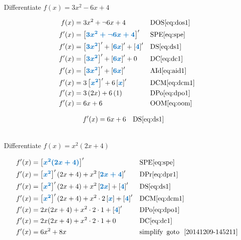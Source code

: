 \documentclass[20150903-160354-rs2.2-MarksMathNotebook.tex]{subfiles}
\begin{document}
\begin{example}[id:20141128-151834] \label{20141128-151834} \hfill \\

Differentiate $f(x)=3x^2-6x+4$

\soln

\solnsteps
\begin{align*}
f(x) &= 3x^2 + \neg 6x + 4 && \text{DOS} \eqref{eq:dos1} \\
f'(x) &= \farg{3x^2 + \neg 6x + 4}' && \text{SPE} \eqref{eq:spe} \\
f'(x) &= \farg{3x^2}' + \farg{6x}' + \farg{4}' && \text{DS} \eqref{eq:ds1} \\
f'(x) &= \farg{3x^2}' + \farg{6x}' + 0 && \text{DC} \eqref{eq:dc1} \\
f'(x) &= \farg{3x^2}' + \farg{6x}' && \text{AId} \eqref{eq:aid1} \\
f'(x) &= 3\farg{x^2}' + 6\farg{x}' && \text{DCM} \eqref{eq:dcm1} \\
f'(x) &= 3 \left(2x \right) + 6 \left(1\right) && \text{DPo} \eqref{eq:dpo1} \\
f'(x) &= 6x+6 && \text{OOM} \eqref{eq:oom}
\end{align*}

\soln
\lesssteps
\begin{align*}
f'(x) & = 6x+6 && \text{DS} \eqref{eq:ds1}
\end{align*}
\end{example}

\begin{example}[id:20141209-144203] \label{20141209-144203} \hfill \\

Differentiate $f(x)=x^2(2x+4)$

\soln

\solnsteps
\begin{align*}
f'(x)&= \farg{x^2(2x+4)}' && \text{SPE} \eqref{eq:spe} \\
f'(x)&= \farg{x^2}'(2x+4)+x^2\farg{2x+4}' && \text{DPr} \eqref{eq:dpr1} \\
f'(x)&= \farg{x^2}'(2x+4)+x^2\farg{2x}+\farg{4}' && \text{DS} \eqref{eq:ds1} \\
f'(x)&= \farg{x^2}'(2x+4)+x^2 \cdot 2 \farg{x}+\farg{4}' && \text{DCM} \eqref{eq:dcm1} \\
f'(x)&= 2x(2x+4)+ x^2\cdot 2 \cdot 1 + \farg{4}' && \text{DPo} \eqref{eq:dpo1} \\
f'(x)&= 2x(2x+4)+ x^2\cdot 2 \cdot 1 + 0 && \text{DC} \eqref{eq:dc1} \\
f'(x)&= 6x^2+8x && \text{simplify} \text{\, goto \,} \, \ref{20141209-145211}\\
\end{align*}
\end{example}
\end{document}
